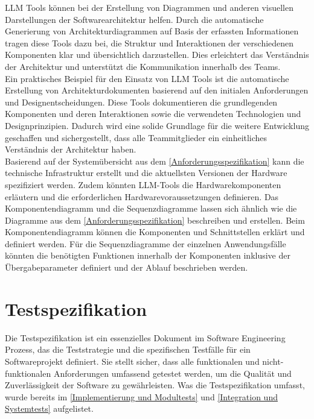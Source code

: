 LLM Tools können bei der Erstellung von Diagrammen und anderen visuellen Darstellungen der Softwarearchitektur helfen. 
Durch die automatische Generierung von Architekturdiagrammen auf Basis der erfassten Informationen tragen diese Tools 
dazu bei, die Struktur und Interaktionen der verschiedenen Komponenten klar und übersichtlich darzustellen. Dies erleichtert 
das Verständnis der Architektur und unterstützt die Kommunikation innerhalb des Teams.\\

Ein praktisches Beispiel für den Einsatz von LLM Tools ist die automatische Erstellung von Architekturdokumenten basierend 
auf den initialen Anforderungen und Designentscheidungen. Diese Tools dokumentieren die grundlegenden Komponenten und deren 
Interaktionen sowie die verwendeten Technologien und Designprinzipien. Dadurch wird eine solide Grundlage für die weitere 
Entwicklung geschaffen und sichergestellt, dass alle Teammitglieder ein einheitliches Verständnis der Architektur haben.\\

Basierend auf der Systemübersicht aus dem \autoref{Anforderungsspezifikation} kann die technische Infrastruktur erstellt 
und die aktuellsten Versionen der Hardware spezifiziert werden. Zudem könnten LLM-Tools die Hardwarekomponenten erläutern und die 
erforderlichen Hardwarevoraussetzungen definieren. Das Komponentendiagramm und die Sequenzdiagramme lassen sich ähnlich 
wie die Diagramme aus dem \autoref{Anforderungsspezifikation} beschreiben und erstellen. Beim Komponentendiagramm können 
die Komponenten und Schnittstellen erklärt und definiert werden. Für die Sequenzdiagramme der einzelnen Anwendungsfälle 
könnten die benötigten Funktionen innerhalb der Komponenten inklusive der Übergabeparameter definiert und der Ablauf 
beschrieben werden.\\

\section{Testspezifikation}  \label{Testspezifikation}

Die Testspezifikation ist ein essenzielles Dokument im Software Engineering Prozess, das die Teststrategie und die spezifischen 
Testfälle für ein Softwareprojekt definiert. Sie stellt sicher, dass alle funktionalen und nicht-funktionalen Anforderungen 
umfassend getestet werden, um die Qualität und Zuverlässigkeit der Software zu gewährleisten. Was die Testspezifikation
umfasst, wurde bereits im \autoref{Implementierung und Modultests} und \autoref{Integration und Systemtests} aufgelistet.\\

